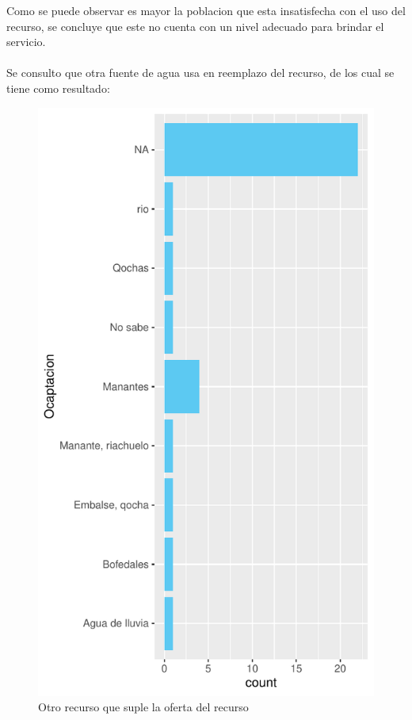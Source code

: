 \documentclass[12pt]{article}\usepackage[]{graphicx}\usepackage[]{xcolor}
\makeatletter
\def\maxwidth{ %
  \ifdim\Gin@nat@width>\linewidth
    \linewidth
  \else
    \Gin@nat@width
  \fi
}
\newenvironment{knitrout}{}{} %
\makeatother
\begin{document}
	Como se puede observar es mayor la poblacion que esta insatisfecha con el uso del recurso, se concluye que este no cuenta con un nivel adecuado para brindar el servicio.\\
	\\
	Se consulto que otra fuente de agua usa en reemplazo del recurso, de los cual se tiene como resultado:
	\begin{figure}[H]
	\centering
\begin{knitrout}
\color{fgcolor}
\includegraphics[width=\maxwidth]{figure/diecisiete-1} 
\end{knitrout}
	\caption{Otro recurso que suple la oferta del recurso}
	\end{figure}
\end{document}
